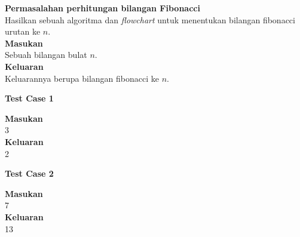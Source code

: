 \FloatBarrier
\begin{konsep}
\label{lat:fibo}
\textbf{Permasalahan perhitungan bilangan Fibonacci}\\
Hasilkan sebuah algoritma dan \textit{flowchart} untuk menentukan bilangan fibonacci urutan ke $n$.\\
\textbf{Masukan}\\
Sebuah bilangan bulat $n$.\\
\textbf{Keluaran}\\
Keluarannya berupa bilangan fibonacci ke $n$.\\
\begin{center}
\textbf{Test Case 1}\\
\end{center}
\textbf{Masukan}\\
3\\
\textbf{Keluaran}\\
2
\begin{center}
\textbf{Test Case 2}\\
\end{center}
\textbf{Masukan}\\
7\\
\textbf{Keluaran}\\
13
\end{konsep}







